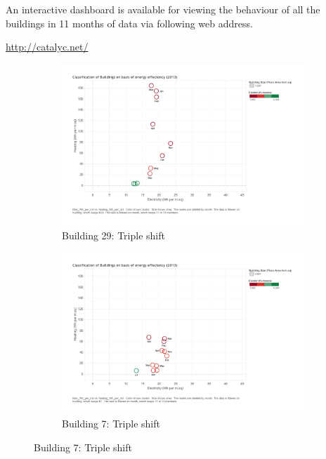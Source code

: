 An interactive dashboard is available for viewing the behaviour of all the buildings in 11 months of data via following web address.

\url{http://catalyc.net/}
   

\begin{figure}
        \centering
        \begin{subfigure}[b]{0.45\textwidth}
                \includegraphics[width=\textwidth]{images/kmeans_b29_3c.pdf}
                \caption{Building 29:  Triple shift}
                \label{fig:tri_1}
        \end{subfigure}%
        \begin{subfigure}[b]{0.45\textwidth}
                \includegraphics[width=\textwidth]{images/kmeans_b7.pdf}
                \caption{Building 7: Triple shift}
                \label{fig:tri_2}
        \end{subfigure}
        

\end{figure}

